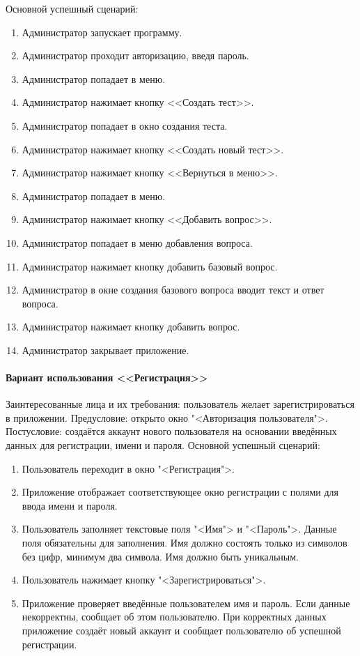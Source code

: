 Основной успешный сценарий:
\begin{enumerate}
	\item Администратор запускает программу.
	\item Администратор проходит авторизацию, введя пароль.
	\item Администратор попадает в меню.
	\item Администратор нажимает кнопку <<Создать тест>>.
	\item Администратор попадает в окно создания теста.
	\item Администратор нажимает кнопку <<Создать новый тест>>.
	\item Администратор нажимает кнопку <<Вернуться в меню>>.
	\item Администратор попадает в меню.
	\item Администратор нажимает кнопку <<Добавить вопрос>>.
	\item Администратор попадает в меню добавления вопроса.
	\item Администратор нажимает кнопку добавить базовый вопрос.
	\item Администратор в окне создания базового вопроса вводит текст и ответ вопроса.
	\item Администратор нажимает кнопку добавить вопрос.
	\item Администратор закрывает приложение.
\end{enumerate}

\paragraph{Вариант использования <<Регистрация>>}

Заинтересованные лица и их требования: пользователь желает зарегистрироваться в приложении.
Предусловие: открыто окно "<Авторизация пользователя">.
Постусловие: создаётся аккаунт нового пользователя на основании введённых данных для регистрации, имени и пароля.
Основной успешный сценарий:
\begin{enumerate}
	\item Пользователь переходит в окно "<Регистрация">.
	\item Приложение отображает соответствующее окно регистрации с полями для ввода имени и пароля.
	\item Пользователь заполняет текстовые поля "<Имя"> и "<Пароль">. Данные поля обязательны для заполнения. Имя должно состоять только из символов без цифр, минимум два символа. Имя должно быть уникальным.
	\item Пользователь нажимает кнопку "<Зарегистрироваться">.
	\item Приложение проверяет введённые пользователем имя и пароль. Если данные некорректны, сообщает об этом пользователю. При корректных данных приложение создаёт новый аккаунт и сообщает пользователю об успешной регистрации.
\end{enumerate}

